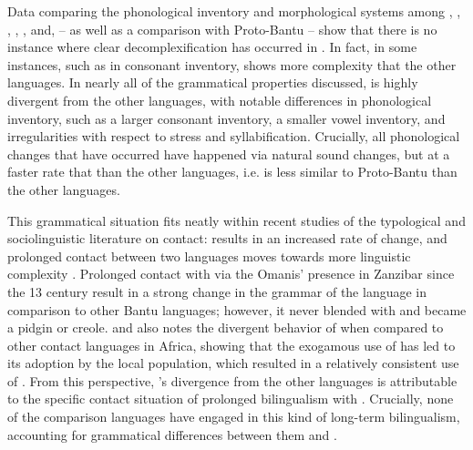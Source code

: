 \documentclass[output=paper,
modfonts
]{langscibook}
\begin{document}
  Data comparing the phonological inventory and morphological systems among , , , , , and,  -- as well as a comparison with Proto-Bantu -- show that there is no instance where clear decomplexification has occurred in . In fact, in some instances, such as in consonant inventory,  shows more complexity that the other languages. In nearly all of the grammatical properties discussed,  is highly divergent from the other languages, with notable differences in phonological inventory, such as a larger consonant inventory, a smaller vowel inventory, and irregularities with respect to stress and syllabification. Crucially, all phonological changes that have occurred have happened via natural sound changes, but at a faster rate that than the other languages, i.e.  is less similar to Proto-Bantu than the other languages. 
  
 This grammatical situation fits neatly within recent studies of the typological and sociolinguistic literature on contact:  results in an increased rate of change, and prolonged contact between two languages moves towards more linguistic complexity \citep{Trudgill2011}. Prolonged contact with  via the Omanis' presence in Zanzibar since the 13 century result in a strong change in the grammar of the language in comparison to other Bantu languages; however, it never blended with  and became a pidgin or creole. \citet{Mufwene2001} and \citet{Mufwene2003} also notes the divergent behavior of  when compared to other contact languages in Africa, showing that the exogamous use of  has led to its adoption by the local population, which resulted in a relatively consistent use of . From this perspective, 's divergence from the other languages is attributable to the specific contact situation of prolonged bilingualism with . Crucially, none of the comparison languages have engaged in this kind of long-term bilingualism, accounting for grammatical differences between them and . 
 
\end{document}
